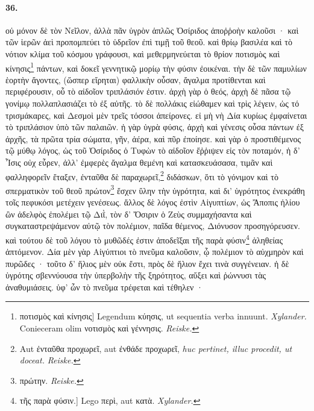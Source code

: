 \documentclass[a4paper, 11pt, oneside, polutonikogreek, german]{article}
\begin{document}
\paragraph{36.}
οὐ μόνον δὲ τὸν Νεῖλον, ἀλλὰ πᾶν ὑγρὸν ἁπλῶς Ὀσίριδος ἀποῤῥοὴν καλοῦσι · καὶ τῶν ἱερῶν ἀεὶ προπομπεύει τὸ ὑδρεῖον ἐπὶ τιμῇ τοῦ θεοῦ. καὶ θρίῳ βασιλέα καὶ τὸ νότιον κλίμα τοῦ κόσμου γράφουσι, καὶ μεθερμηνεύεται τὸ θρίον ποτισμὸς καὶ κίνησις\footnote{ποτισμὸς καὶ κίνησις] Legendum κύησις, ut sequentia verba innuunt. \emph{Xylander.} Conieceram olim νοτισμὸς καὶ γέννησις. \emph{Reiske.}} πάντων, καὶ δοκεῖ γεννητικῷ μορίῳ τὴν φύσιν ἐοικέναι. τὴν δὲ τῶν παμυλίων ἑορτὴν ἄγοντες, (ὥσπερ εἴρηται) φαλλικὴν οὖσαν, ἄγαλμα προτίθενται καὶ περιφέρουσιν, οὗ τὸ αἰδοῖον τριπλάσιόν ἐστιν. ἀρχὴ γὰρ ὁ θεός, ἀρχὴ δὲ πᾶσα τῷ γονίμῳ πολλαπλασιάζει τὸ ἐξ αὐτῆς. τὸ δὲ πολλάκις εἰώθαμεν καὶ τρὶς λέγειν, ὡς τό τρισμάκαρες, καὶ Δεσμοὶ μὲν τρεῖς τόσσοι ἀπείρονες. εἰ μὴ νὴ Δία κυρίως ἐμφαίνεται τὸ τριπλάσιον ὑπὸ τῶν παλαιῶν. ἡ γὰρ ὑγρὰ φύσις, ἀρχὴ καὶ γένεσις οὖσα πάντων ἐξ ἀρχῆς, τὰ πρῶτα τρία σώματα, γῆν, ἀέρα, καὶ πῦρ ἐποίησε. καὶ γὰρ ὁ προστιθέμενος τῷ μύθῳ λόγος, ὡς τοῦ Ὀσίριδος ὁ Τυφὼν τὸ αἰδοῖον ἔῤῥιψεν εἰς τὸν ποταμόν, ἡ δ' Ἶσις οὐχ εὗρεν, ἀλλ' ἐμφερὲς ἄγαλμα θεμένη καὶ κατασκευάσασα, τιμᾶν καὶ φαλληφορεῖν ἔταξεν, ἐνταῦθα δὲ παραχωρεῖ,\footnote{Aut ἐνταῦθα προχωρεῖ, aut ἐνθάδε προχωρεῖ, \emph{huc pertinet, illuc procedit, ut doceat.} \emph{Reiske.}} διδάσκων, ὅτι τὸ γόνιμον καὶ τὸ σπερματικὸν τοῦ θεοῦ πρώτον\footnote{πρώτην. \emph{Reiske.}} ἔσχεν ὕλην τὴν ὑγρότητα, καὶ δι' ὑγρότητος ἐνεκράθη τοῖς πεφυκόσι μετέχειν γενέσεως. ἄλλος δὲ λόγος ἐστὶν Αἰγυπτίων, ὡς Ἄποπις ἡλίου ὢν ἀδελφὸς ἐπολέμει τῷ Διῒ, τὸν δ' Ὄσιριν ὁ Ζεὺς συμμαχήσαντα καὶ συγκαταστρεψάμενον αὐτῷ τὸν πολέμιον, παῖδα θέμενος, Διόνυσον προσηγόρευσεν. καὶ τούτου δὲ τοῦ λόγου τὸ μυθῶδές ἐστιν ἀποδεῖξαι τῆς παρὰ φύσιν\footnote{τῆς παρὰ φύσιν.] Lego περὶ, aut κατὰ. \emph{Xylander.}} ἀληθείας ἁπτόμενον. Δία μὲν γὰρ Αἰγύπτιοι τὸ πνεῦμα καλοῦσιν, ᾧ πολέμιον τὸ αὐχμηρὸν καὶ πυρῶδες · τοῦτο δ' ἥλιος μὲν οὐκ ἔστι, πρὸς δὲ ἥλιον ἔχει τινὰ συγγένειαν. ἡ δὲ ὑγρότης σβεννύουσα τὴν ὑπερβολὴν τῆς ξηρότητος, αὔξει καὶ ῥώννυσι τὰς ἀναθυμιάσεις. ὑφ' ὧν τὸ πνεῦμα τρέφεται καὶ τέθηλεν ·
\end{document}
